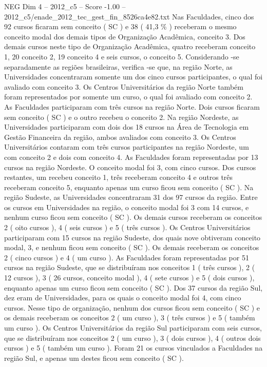 \begin{textsample}{NEG Dim 4 – 2012\_c5 – Score -1.00 – 2012\_c5/enade\_2012\_tec\_gest\_fin\_8526ca4e82.txt}
Nas Faculdades, cinco dos 92 cursos ficaram sem conceito ( SC ) e 38 ( 41,3 \% ) receberam o mesmo conceito modal dos demais tipos de Organização Acadêmica, conceito 3.
Dos demais cursos neste tipo de Organização Acadêmica, quatro receberam conceito 1, 20 conceito 2, 19 conceito 4 e seis cursos, o conceito 5.
Considerando -se separadamente as regiões brasileiras, verifica -se que, na região Norte, as Universidades concentraram somente um dos cinco cursos participantes, o qual foi avaliado com conceito 3.
Os Centros Universitários da região Norte também foram representados por somente um curso, o qual foi avaliado com conceito 2.
As Faculdades participaram com três cursos na região Norte.
Dois cursos ficaram sem conceito ( SC ) e o outro recebeu o conceito 2.
Na região Nordeste, as Universidades participaram com dois dos 18 cursos na Área de Tecnologia em Gestão Financeira da região, ambos avaliados com conceito 3.
Os Centros Universitários contaram com três cursos participantes na região Nordeste, um com conceito 2 e dois com conceito 4.
As Faculdades foram representadas por 13 cursos na região Nordeste.
O conceito modal foi 3, com cinco cursos.
Dos cursos restantes, um recebeu conceito 1, três receberam conceito 4 e outros três receberam conceito 5, enquanto apenas um curso ficou sem conceito ( SC ).
Na região Sudeste, as Universidades concentraram 31 dos 97 cursos da região.
Entre os cursos em Universidades na região, o conceito modal foi 3 com 14 cursos, e nenhum curso ficou sem conceito ( SC ).
Os demais cursos receberam os conceitos 2 ( oito cursos ), 4 ( seis cursos ) e 5 ( três cursos ).
Os Centros Universitários participaram com 15 cursos na região Sudeste, dos quais nove obtiveram conceito modal, 3, e nenhum ficou sem conceito ( SC ).
Os demais receberam os conceitos 2 ( cinco cursos ) e 4 ( um curso ).
As Faculdades foram representadas por 51 cursos na região Sudeste, que se distribuíram nos conceitos 1 ( três cursos ), 2 ( 12 cursos ), 3 ( 26 cursos, conceito modal ), 4 ( sete cursos ) e 5 ( dois cursos ), enquanto apenas um curso ficou sem conceito ( SC ).
Dos 37 cursos da região Sul, dez eram de Universidades, para os quais o conceito modal foi 4, com cinco cursos.
Nesse tipo de organização, nenhum dos cursos ficou sem conceito ( SC ) e os demais receberam os conceitos 2 ( um curso ), 3 ( três cursos ) e 5 ( também um curso ).
Os Centros Universitários da região Sul participaram com seis cursos, que se distribuíram nos conceitos 2 ( um curso ), 3 ( dois cursos ), 4 ( outros dois cursos ) e 5 ( também um curso ).
Foram 21 os cursos vinculados a Faculdades na região Sul, e apenas um destes ficou sem conceito ( SC ).

\end{textsample}
